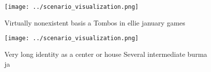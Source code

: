 \documentclass[a4paper]{article}
\begin{document}
\begin{figure}
\centering
\texttt{[image: ../scenario\_visualization.png]}
\caption{Virtually nonexistent basis a Tombos in ellie january games
}
\end{figure}
 
\begin{figure}
\centering
\texttt{[image: ../scenario\_visualization.png]}
\caption{Very long identity as a center or house Several intermediate burma ja
}
\end{figure}
 
\end{document}

